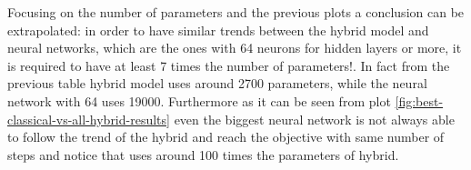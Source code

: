 \newline
\vspace{0.2 cm}
\newline
Focusing on the number of parameters and the previous plots a conclusion can be extrapolated: in order to have similar trends between the hybrid model and neural networks, which are the ones with 64 neurons for hidden layers or more, it is required to have at least 7 times the number of parameters!. In fact from the previous table hybrid model uses around 2700 parameters, while the neural network with 64 uses 19000. Furthermore as it can be seen from plot \ref{fig:best-classical-vs-all-hybrid-results} even the biggest neural network is not always able to follow the trend of the hybrid and reach the objective with same number of steps and notice that uses around 100 times the parameters of hybrid.